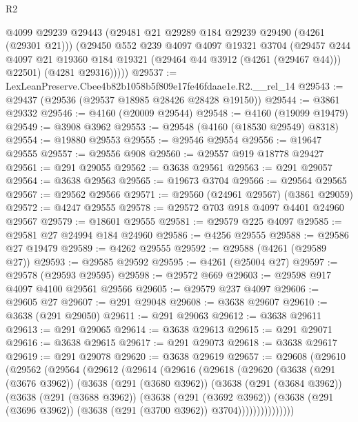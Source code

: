 \begin{lexlean}{R2}
\begin{coremodule}
          @4099
          @29239
          @29443
          (@29481 @21 @29289 @184 @29239 @29490 (@4261 (@29301 @21)))
          (@29450
            @552
            @239
            @4097
            @4097
            @19321
            @3704
            (@29457
              @244
              @4097
              @21
              @19360
              @184
              @19321
              (@29464 @44 @3912 (@4261 (@29467 @44)))
              @22501)
            (@4281 @29316)))))
@29537 := LexLeanPreserve.Cbee4b82b1058b5f809e17fe46fdaae1e.R2.__rel_14
@29543 := @29437 (@29536 (@29537 @18985 @28426 @28428 @19150))
@29544 := @3861 @29332
@29546 := @4160 (@20009 @29544)
@29548 := @4160 (@19099 @19479)
@29549 := @3908 @3962
@29553 := @29548 (@4160 (@18530 @29549) @8318)
@29554 := @19880 @29553
@29555 := @29546 @29554
@29556 := @19647 @29555
@29557 := @29556 @908
@29560 := @29557 @919 @18778 @29427
@29561 := @291 @29055
@29562 := @3638 @29561
@29563 := @291 @29057
@29564 := @3638 @29563
@29565 := @19673 @3704
@29566 := @29564 @29565
@29567 := @29562 @29566
@29571 := @29560 (@24961 @29567) (@3861 @29059)
@29572 := @4247 @29555
@29578 := @29572 @703 @918 @4097 @4401 @24960 @29567
@29579 := @18601 @29555
@29581 := @29579 @225 @4097
@29585 := @29581 @27 @24994 @184 @24960
@29586 := @4256 @29555
@29588 := @29586 @27 @19479
@29589 := @4262 @29555
@29592 := @29588 (@4261 (@29589 @27))
@29593 := @29585 @29592
@29595 := @4261 (@25004 @27)
@29597 := @29578 (@29593 @29595)
@29598 := @29572 @669
@29603 := @29598 @917 @4097 @4100 @29561 @29566
@29605 := @29579 @237 @4097
@29606 := @29605 @27
@29607 := @291 @29048
@29608 := @3638 @29607
@29610 := @3638 (@291 @29050)
@29611 := @291 @29063
@29612 := @3638 @29611
@29613 := @291 @29065
@29614 := @3638 @29613
@29615 := @291 @29071
@29616 := @3638 @29615
@29617 := @291 @29073
@29618 := @3638 @29617
@29619 := @291 @29078
@29620 := @3638 @29619
@29657 := @29608
    (@29610
      (@29562
        (@29564
          (@29612
            (@29614
              (@29616
                (@29618
                  (@29620
                    (@3638
                      (@291 (@3676 @3962))
                      (@3638
                        (@291 (@3680 @3962))
                        (@3638
                          (@291 (@3684 @3962))
                          (@3638
                            (@291 (@3688 @3962))
                            (@3638
                              (@291 (@3692 @3962))
                              (@3638
                                (@291 (@3696 @3962))
                                (@3638 (@291 (@3700 @3962)) @3704)))))))))))))))

\end{coremodule}
\end{lexlean}
